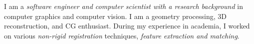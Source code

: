 

\begin{cvparagraph}

I am a \textit{software engineer and computer scientist with a research background} in 
computer graphics and computer vision. I am a geometry processing, 3D
reconstruction, and CG enthusiast. During my experience in academia, I worked
on various \textit{non-rigid registration} techniques, \textit{feature extraction and matching}.
\end{cvparagraph}